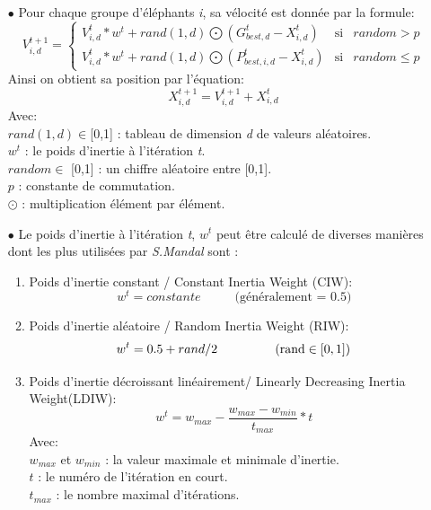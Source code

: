 \begin{itemize}
	
	\item[$\bullet$] Pour chaque groupe d'éléphants \textit{i},  sa vélocité est donnée par la formule:
	\begin{equation}
	\label{eq:vi}
	V_{i,d}^{t+1}=
	\left\lbrace
	\begin{array}{ccc}
	V_{i,d}^{t} * w^t + rand(1,d) \bigodot  (G_{best,d}^{t} - X_{i,d}^{t} ) & \mbox{si} & random > p\\
	V_{i,d}^{t} * w^t + rand(1,d) \bigodot  (P_{best,i,d}^{t} - X_{i,d}^{t} )  & \mbox{si} & random \leq p
	\end{array}\right.
	\end{equation}
	Ainsi on obtient sa position par l'équation:
	\begin{equation}
	\label{eq:xi}
	X_{i,d}^{t+1} = V_{i,d}^{t+1} + X_{i,d}^{t}
	\end{equation}
	Avec:\\ 
	$rand(1,d) \in $[0,1] : tableau de dimension \textit{d} de valeurs aléatoires.\\
	$w^{t} $ : le poids d'inertie à l'itération \textit{t}.\\
	$random \in$ [0,1] : un chiffre aléatoire entre [0,1].\\
	$p$ : constante de commutation.\\
	$\odot$ : multiplication élément par élément.\\
	
	
	\item[$\bullet$]Le poids d'inertie à l'itération \textit{t},  $w^{t} $ peut être calculé de diverses manières dont les plus utilisées par \textit{S.Mandal}  sont :
	\begin{enumerate}
		\item Poids d'inertie constant / Constant Inertia Weight (CIW):
		\begin{equation}
		w^t = constante \hspace{1cm}
		\text{   (généralement = 0.5)}
		\end{equation}
		
		\item Poids d'inertie aléatoire / Random Inertia Weight (RIW):
		\begin{equation}
		w^t = 0.5 + rand/2 \hspace{1.5cm} \text{  (rand} \in [0,1])
		\end{equation}
		
		\item Poids d'inertie décroissant linéairement/ Linearly Decreasing Inertia Weight(LDIW):
		\label{LDIW}
		\begin{equation}
		\label{eq:wt}
		w^{t} = w_{max} - \frac{w_{max} - w_{min}}{t_{max}} * t
		\end{equation}
		Avec:\\
		$w_{max}$ et $w_{min}$ : la valeur maximale et minimale d'inertie.\\
		$t$ : le numéro de l'itération en court.\\
		$t_{max}$ : le nombre maximal d'itérations.
	\end{enumerate}
\end{itemize}



